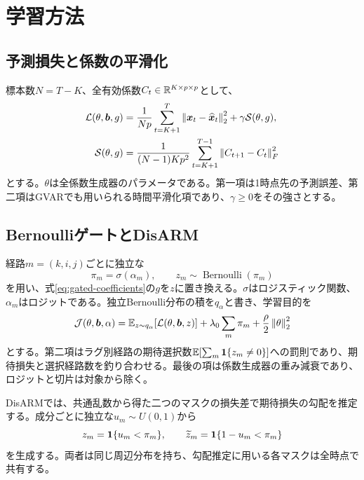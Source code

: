 \section{学習方法}
\label{sec:learning}
\subsection{予測損失と係数の平滑化}
標本数\(N=T-K\)、全有効係数\(C_t\in\mathbb{R}^{K\times p\times p}\)として、
\begin{align}
 \mathcal L(\theta,\bm b,g)
 &=\frac{1}{Np}\sum_{t=K+1}^{T}
       \left\lVert \bm x_t-\widehat{\bm x}_t\right\rVert_2^2
   +\gamma\mathcal S(\theta,g),\label{eq:common-loss}\\
 \mathcal S(\theta,g)
 &=\frac{1}{(N-1)Kp^2}
       \sum_{t=K+1}^{T-1}\left\lVert C_{t+1}-C_t\right\rVert_F^2
 \label{eq:smoothness}
\end{align}
とする。\(\theta\)は全係数生成器のパラメータである。第一項は1時点先の予測誤差、第二項はGVARでも用いられる時間平滑化項であり、\(\gamma\ge0\)をその強さとする\citep{marcinkevics2021}。

\subsection{BernoulliゲートとDisARM}
経路\(m=(k,i,j)\)ごとに独立な
\begin{equation}
 \pi_m=\sigma(\alpha_m),\qquad
 z_m\sim\operatorname{Bernoulli}(\pi_m)
 \label{eq:bernoulli}
\end{equation}
を用い、式\eqref{eq:gated-coefficients}の\(g\)を\(z\)に置き換える。\(\sigma\)はロジスティック関数、\(\alpha_m\)はロジットである。独立Bernoulli分布の積を\(q_\alpha\)と書き、学習目的を
\begin{equation}
 \mathcal J(\theta,\bm b,\alpha)
 =\mathbb{E}_{z\sim q_\alpha}\!\left[\mathcal L(\theta,\bm b,z)\right]
  +\lambda_0\sum_m\pi_m+\frac{\rho}{2}\left\lVert \theta\right\rVert_2^2
 \label{eq:binary-objective}
\end{equation}
とする。第二項はラグ別経路の期待選択数\(\mathbb{E}[\sum_m\mathbf{1}\{z_m\ne0\}]\)への罰則であり、期待損失と選択経路数を釣り合わせる。最後の項は係数生成器の重み減衰であり、ロジットと切片は対象から除く。

DisARM\citep{dong2020}では、共通乱数から得た二つのマスクの損失差で期待損失の勾配を推定する。成分ごとに独立な\(u_m\sim U(0,1)\)から
\begin{equation}
 z_m=\mathbf{1}\{u_m<\pi_m\},\qquad
 \widetilde z_m=\mathbf{1}\{1-u_m<\pi_m\}
 \label{eq:antithetic}
\end{equation}
を生成する。両者は同じ周辺分布を持ち、勾配推定に用いる各マスクは全時点で共有する。

